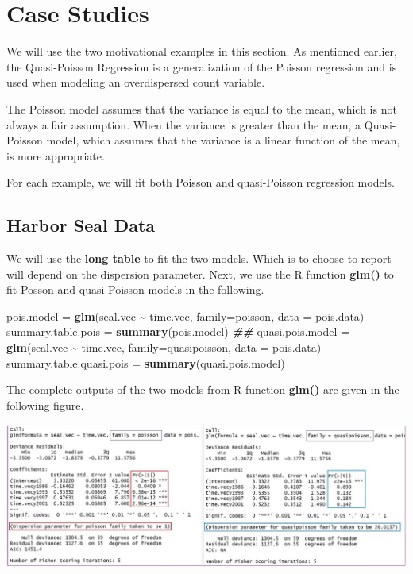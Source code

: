 \documentclass[
]{book}
\newenvironment{Shaded}{\begin{snugshade}}{\end{snugshade}}
\newcommand{\AttributeTok}[1]{\textcolor[rgb]{0.13,0.29,0.53}{#1}}
\newcommand{\DocumentationTok}[1]{\textcolor[rgb]{0.56,0.35,0.01}{\textbf{\textit{#1}}}}
\newcommand{\FunctionTok}[1]{\textcolor[rgb]{0.13,0.29,0.53}{\textbf{#1}}}
\newcommand{\NormalTok}[1]{#1}
\newcommand{\OtherTok}[1]{\textcolor[rgb]{0.56,0.35,0.01}{#1}}
\newcommand{\SpecialCharTok}[1]{\textcolor[rgb]{0.81,0.36,0.00}{\textbf{#1}}}
\begin{document}
\hypertarget{case-studies-3}{%
\section{Case Studies}\label{case-studies-3}}

We will use the two motivational examples in this section. As mentioned earlier, the Quasi-Poisson Regression is a generalization of the Poisson regression and is used when modeling an overdispersed count variable.

The Poisson model assumes that the variance is equal to the mean, which is not always a fair assumption. When the variance is greater than the mean, a Quasi-Poisson model, which assumes that the variance is a linear function of the mean, is more appropriate.

For each example, we will fit both Poisson and quasi-Poisson regression models.

\hypertarget{harbor-seal-data}{%
\subsection{Harbor Seal Data}\label{harbor-seal-data}}

We will use the \textbf{long table} to fit the two models. Which is to choose to report will depend on the dispersion parameter. Next, we use the R function \textbf{glm()} to fit Posson and quasi-Poisson models in the following.

\begin{Shaded}
\begin{Highlighting}[]
\NormalTok{pois.model }\OtherTok{=} \FunctionTok{glm}\NormalTok{(seal.vec }\SpecialCharTok{\textasciitilde{}}\NormalTok{ time.vec, }\AttributeTok{family=}\NormalTok{poisson, }\AttributeTok{data =}\NormalTok{ pois.data)}
\NormalTok{summary.table.pois }\OtherTok{=} \FunctionTok{summary}\NormalTok{(pois.model)}
\DocumentationTok{\#\#}
\NormalTok{quasi.pois.model }\OtherTok{=} \FunctionTok{glm}\NormalTok{(seal.vec }\SpecialCharTok{\textasciitilde{}}\NormalTok{ time.vec, }\AttributeTok{family=}\NormalTok{quasipoisson, }\AttributeTok{data =}\NormalTok{ pois.data)}
\NormalTok{summary.table.quasi.pois }\OtherTok{=} \FunctionTok{summary}\NormalTok{(quasi.pois.model)}
\end{Highlighting}
\end{Shaded}

The complete outputs of the two models from R function \textbf{glm()} are given in the following figure.

\begin{center}\includegraphics[width=0.8\linewidth]{img13/w13-PoissonQuasiPois-Output} \end{center}
\end{document}
